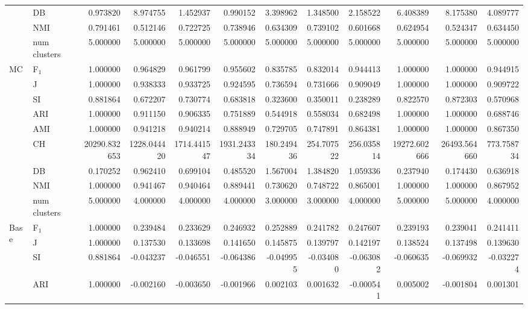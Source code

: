 \begin{tabular}{llrrrrrrrrrr}
 & DB & 0.973820 & 8.974755 & 1.452937 & 0.990152 & 3.398962 & 1.348500 & 2.158522 & 6.408389 & 8.175380 & 4.089777 \\
 & NMI & 0.791461 & 0.512146 & 0.722725 & 0.738946 & 0.634309 & 0.739102 & 0.601668 & 0.624954 & 0.524347 & 0.634450 \\
 & num clusters & 5.000000 & 5.000000 & 5.000000 & 5.000000 & 5.000000 & 5.000000 & 5.000000 & 5.000000 & 5.000000 & 5.000000 \\
\multirow[c]{9}{*}{MC} & F$_1$ & 1.000000 & 0.964829 & 0.961799 & 0.955602 & 0.835785 & 0.832014 & 0.944413 & 1.000000 & 1.000000 & 0.944915 \\
 & J & 1.000000 & 0.938333 & 0.933725 & 0.924595 & 0.736594 & 0.731666 & 0.909049 & 1.000000 & 1.000000 & 0.909722 \\
 & SI & 0.881864 & 0.672207 & 0.730774 & 0.683818 & 0.323600 & 0.350011 & 0.238289 & 0.822570 & 0.872303 & 0.570968 \\
 & ARI & 1.000000 & 0.911150 & 0.906335 & 0.751889 & 0.544918 & 0.558034 & 0.682498 & 1.000000 & 1.000000 & 0.688746 \\
 & AMI & 1.000000 & 0.941218 & 0.940214 & 0.888949 & 0.729705 & 0.747891 & 0.864381 & 1.000000 & 1.000000 & 0.867350 \\
 & CH & 20290.832653 & 1228.044420 & 1714.441547 & 1931.243334 & 180.249436 & 254.707522 & 256.035814 & 19272.602666 & 26493.564660 & 773.758734 \\
 & DB & 0.170252 & 0.962410 & 0.699104 & 0.485520 & 1.567004 & 1.384820 & 1.059336 & 0.237940 & 0.174430 & 0.636918 \\
 & NMI & 1.000000 & 0.941467 & 0.940464 & 0.889441 & 0.730620 & 0.748722 & 0.865001 & 1.000000 & 1.000000 & 0.867952 \\
 & num clusters & 5.000000 & 4.000000 & 4.000000 & 4.000000 & 3.000000 & 3.000000 & 4.000000 & 5.000000 & 5.000000 & 4.000000 \\
\multirow[c]{9}{*}{Base} & F$_1$ & 1.000000 & 0.239484 & 0.233629 & 0.246932 & 0.252889 & 0.241782 & 0.247607 & 0.239193 & 0.239041 & 0.241411 \\
 & J & 1.000000 & 0.137530 & 0.133698 & 0.141650 & 0.145875 & 0.139797 & 0.142197 & 0.138524 & 0.137498 & 0.139630 \\
 & SI & 0.881864 & -0.043237 & -0.046551 & -0.064386 & -0.049955 & -0.034080 & -0.063082 & -0.060635 & -0.069932 & -0.032274 \\
 & ARI & 1.000000 & -0.002160 & -0.003650 & -0.001966 & 0.002103 & 0.001632 & -0.000541 & 0.005002 & -0.001804 & 0.001301 \\

\end{tabular}
